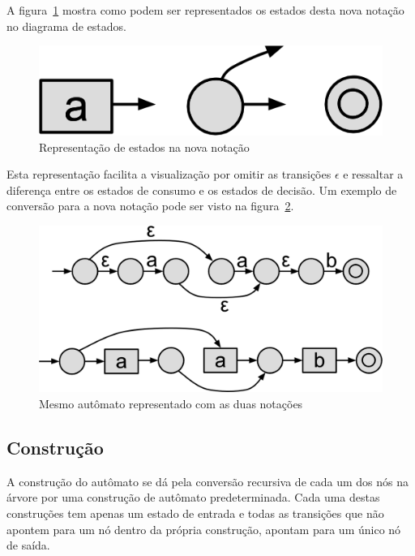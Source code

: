 \documentclass[a4paper,12pt,oneside,onecolumn]{uerj}
\begin{document}
A figura~\ref{fig:nova_notacao} mostra como podem ser representados os estados desta nova notação no diagrama de estados.

\begin{figure}[ht]
  \centering
  \includegraphics[scale=0.5]{figures/nova_notacao.png}
  \caption{Representação de estados na nova notação}
  \label{fig:nova_notacao}
\end{figure}

Esta representação facilita a visualização por omitir as transições $\epsilon$ e ressaltar a diferença entre os estados de consumo e os estados de decisão. Um exemplo de conversão para a nova notação pode ser visto na figura~\ref{fig:exemplo_nova_notacao}.

\begin{figure}[ht]
  \centering
  \includegraphics[scale=0.25]{figures/exemplo_nova_notacao.png}
  \caption{Mesmo autômato representado com as duas notações}
  \label{fig:exemplo_nova_notacao}
\end{figure}

\subsection{Construção}

A construção do autômato se dá pela conversão recursiva de cada um dos nós na árvore por uma construção de autômato predeterminada. Cada uma destas construções tem apenas um estado de entrada e todas as transições que não apontem para um nó dentro da própria construção, apontam para um único nó de saída.
\end{document}
